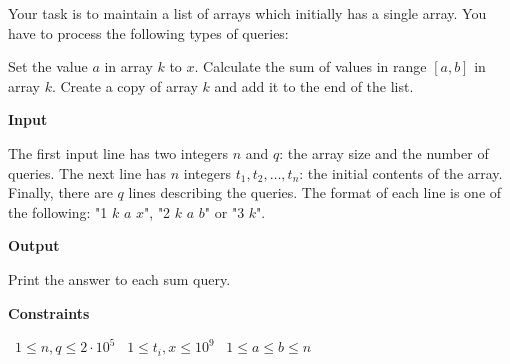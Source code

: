 Your task is to maintain a list of arrays which initially has a single array. You have to process the following types of queries:

Set the value $a$ in array $k$ to $x$.
Calculate the sum of values in range $[a,b]$ in array $k$.
Create a copy of array $k$ and add it to the end of the list.

\vspace{0.3cm}\noindent\textbf{Input}

The first input line has two integers $n$ and $q$: the array size and the number of queries.
The next line has $n$ integers $t_1,t_2,\ldots,t_n$: the initial contents of the array.
Finally, there are $q$ lines describing the queries. The format of each line is one of the following: "1 $k$ $a$ $x$", "2 $k$ $a$ $b$" or "3 $k$".

\vspace{0.3cm}\noindent\textbf{Output}

Print the answer to each sum query.

\vspace{0.3cm}\noindent\textbf{Constraints}

\textbullet\ $1 \le n, q \le 2 \cdot 10^5$
\textbullet\ $1 \le t_i, x \le 10^9$
\textbullet\ $1 \le a \le b \le n$